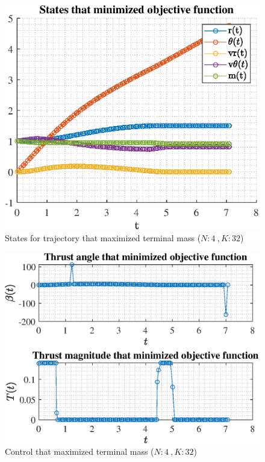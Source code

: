 \documentclass[]{article}
\begin{document}
\begin{figure}
	\centering
	\includegraphics[scale=0.75]{states_N4_K32_C3_mf.eps}
	\caption{States for trajectory that maximized terminal mass (\(N:4\ , K:32\))}
	\label{fig:states_N4_K32_C3_mf}
\end{figure}
\begin{figure}
	\centering
	\includegraphics[scale=0.75]{control_N4_K32_C3_mf.eps}
	\caption{Control that maximized terminal mass (\(N:4\ , K:32\))}
	\label{fig:control_N4_K32_C3_mf}
\end{figure}
\end{document}

